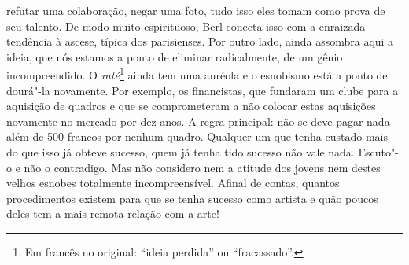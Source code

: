 refutar uma colaboração, negar uma foto, tudo isso eles tomam como prova
de seu talento. De modo muito espirituoso, Berl conecta isso com a
enraizada tendência à ascese, típica dos parisienses. Por outro lado,
ainda assombra aqui a ideia, que nós estamos a ponto de eliminar
radicalmente, de um gênio incompreendido. O \emph{raté}\footnote{Em francês no original:
  ``ideia perdida'' ou ``fracassado''. \versal{[N. T.]}} ainda tem
uma auréola e o esnobismo está a ponto de dourá"-la novamente. Por
exemplo, os financistas, que fundaram um clube para a aquisição de
quadros e que se comprometeram a não colocar estas aquisições novamente
no mercado por dez anos. A regra principal: não se deve pagar nada além
de 500 francos por nenhum quadro. Qualquer um que tenha custado mais do
que isso já obteve sucesso, quem já tenha tido sucesso não vale nada.
Escuto"-o e não o contradigo. Mas não considero nem a atitude dos jovens
nem destes velhos esnobes totalmente incompreensível. Afinal de contas,
quantos procedimentos existem para que se tenha sucesso como artista e
quão poucos deles tem a mais remota relação com a arte!

